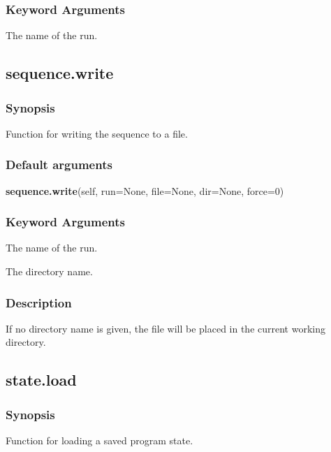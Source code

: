 \subsubsection{Keyword Arguments}

  The name of the run.


\newpage

\subsection{sequence.write}


\subsubsection{Synopsis}

Function for writing the sequence to a file.

\subsubsection{Default arguments}

\textsf{\textbf{sequence.write}(self, run=None, file=None, dir=None, force=0)}


\subsubsection{Keyword Arguments}

  The name of the run.

  The directory name.


\subsubsection{Description}

If no directory name is given, the file will be placed in the current working directory.


\newpage

\subsection{state.load}


\subsubsection{Synopsis}

Function for loading a saved program state.

